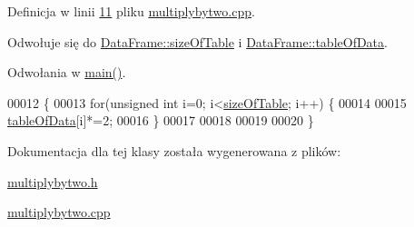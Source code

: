 Definicja w linii \hyperlink{multiplybytwo_8cpp_source_l00011}{11} pliku \hyperlink{multiplybytwo_8cpp_source}{multiplybytwo.\-cpp}.



Odwołuje się do \hyperlink{dataframe_8h_source_l00034}{Data\-Frame\-::size\-Of\-Table} i \hyperlink{dataframe_8h_source_l00021}{Data\-Frame\-::table\-Of\-Data}.



Odwołania w \hyperlink{main_8cpp_source_l00017}{main()}.


\begin{DoxyCode}
00012 \{
00013         \textcolor{keywordflow}{for}(\textcolor{keywordtype}{unsigned} \textcolor{keywordtype}{int} i=0; i<\hyperlink{class_data_frame_aa5d1905c6910cad07ab5189bd34b13ab}{sizeOfTable}; i++) \{
00014 
00015                 \hyperlink{class_data_frame_a8edc4ce524483e2e5069067267ccdcbf}{tableOfData}[i]*=2;
00016         \}
00017 
00018 
00019 
00020 \}
\end{DoxyCode}


Dokumentacja dla tej klasy została wygenerowana z plików\-:\begin{DoxyCompactItemize}
\item 
\hyperlink{multiplybytwo_8h}{multiplybytwo.\-h}\item 
\hyperlink{multiplybytwo_8cpp}{multiplybytwo.\-cpp}\end{DoxyCompactItemize}
